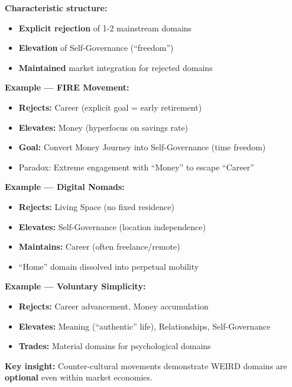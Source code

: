 \begin{tcolorbox}[colback=purple!5!white, colframe=purple!75!black, title=Pattern: Counter-Cultural (N$_{\text{eff}}$ = 5-6)]

\textbf{Characteristic structure:}
\begin{itemize}[nosep]
\item \textbf{Explicit rejection} of 1-2 mainstream domains
\item \textbf{Elevation} of Self-Governance (``freedom'')
\item \textbf{Maintained} market integration for rejected domains
\end{itemize}

\textbf{Example --- FIRE Movement:}
\begin{itemize}[nosep]
\item \textbf{Rejects:} Career (explicit goal = early retirement)
\item \textbf{Elevates:} Money (hyperfocus on savings rate)
\item \textbf{Goal:} Convert Money Journey into Self-Governance (time freedom)
\item Paradox: Extreme engagement with ``Money'' to escape ``Career''
\end{itemize}

\textbf{Example --- Digital Nomads:}
\begin{itemize}[nosep]
\item \textbf{Rejects:} Living Space (no fixed residence)
\item \textbf{Elevates:} Self-Governance (location independence)
\item \textbf{Maintains:} Career (often freelance/remote)
\item ``Home'' domain dissolved into perpetual mobility
\end{itemize}

\textbf{Example --- Voluntary Simplicity:}
\begin{itemize}[nosep]
\item \textbf{Rejects:} Career advancement, Money accumulation
\item \textbf{Elevates:} Meaning (``authentic'' life), Relationships, Self-Governance
\item \textbf{Trades:} Material domains for psychological domains
\end{itemize}

\textbf{Key insight:} Counter-cultural movements demonstrate WEIRD domains are \textbf{optional} even within market economies.

\end{tcolorbox}

